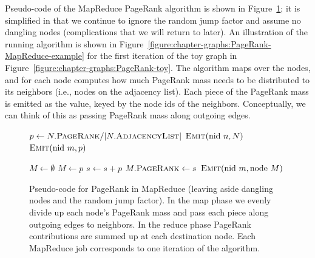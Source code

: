 Pseudo-code of the MapReduce PageRank algorithm is shown in
Figure~\ref{figure:chapter-graphs:PageRank}; it is simplified in that we
continue to ignore the random jump factor and assume no dangling nodes
(complications that we will return to later).  An illustration of the
running algorithm is shown in
Figure~\ref{figure:chapter-graphs:PageRank-MapReduce-example} for the first
iteration of the toy graph in
Figure~\ref{figure:chapter-graphs:PageRank-toy}.  The algorithm maps over
the nodes, and for each node computes how much PageRank mass needs to
be distributed to its neighbors (i.e., nodes on the adjacency list).
Each piece of the PageRank mass is emitted as the value, keyed by the node
ids of the neighbors.  Conceptually, we can think of this as passing
PageRank mass along outgoing edges.

\begin{figure}[t]
\algrenewcommand{}
\algrenewcommand{}
  \begin{algorithmic}[1]
    \State $p \gets N.\textsc{PageRank} / |N.\textsc{AdjacencyList}|$
    \State $\textsc{Emit}(\textrm{nid }n, N)$
      \State $\textsc{Emit}(\textrm{nid }m, p)$
    \EndFor
    \EndProcedure
    \EndFunction
  \end{algorithmic}

  \begin{algorithmic}[1]
    \State $M \gets \emptyset$
        \State $M \gets p$
      \Else
        \State $s \gets s + p$
      \EndIf
    \EndFor
    \State $M.\textsc{PageRank} \gets s$
    \State $\textsc{Emit}(\textrm{nid }m, \textrm{node }M)$
    \EndProcedure
    \EndFunction
  \end{algorithmic}
  \caption{Pseudo-code for PageRank in MapReduce (leaving aside
    dangling nodes and the random jump factor).  In the map phase we
    evenly divide up each node's PageRank mass and pass each piece
    along outgoing edges to neighbors.  In the reduce phase PageRank
    contributions are summed up at each destination node.  Each
    MapReduce job corresponds to one iteration of the algorithm.}
\label{figure:chapter-graphs:PageRank}
\end{figure}

